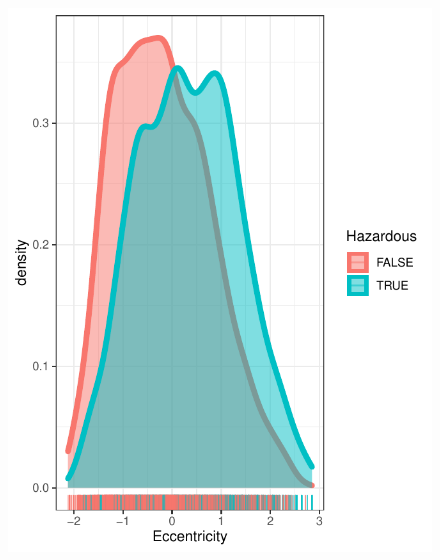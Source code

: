 \documentclass{beamer}
\begin{document}
\begin{frame}
\begin{columns}
\begin{figure}[b]{\textwidth}
    \includegraphics[width=\textwidth]{Pic/DENSITY_Eccentricity.pdf}
    \vspace{4ex}
  \end{figure}
\end{columns}
\end{frame}
\end{document}
